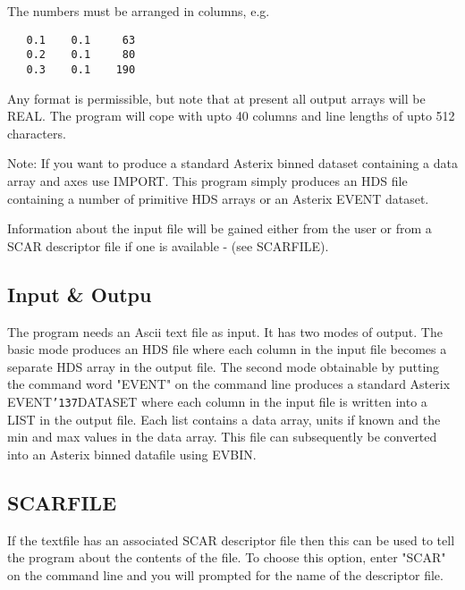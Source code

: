 \documentclass{book}
\renewcommand{\_}{{\tt\char'137}}     %
\begin{document}
The numbers must be arranged in columns, e.g.
 
\begin{verbatim}
   0.1    0.1     63
   0.2    0.1     80
   0.3    0.1    190
\end{verbatim}
Any format is permissible, but note that at present all output arrays
will be REAL. The program will cope with upto 40 columns and line
lengths of upto 512 characters.
 
Note: If you want to produce a standard Asterix binned dataset containing
a data array and axes use IMPORT. This program simply produces an
HDS file containing a number of primitive HDS arrays or an Asterix
EVENT dataset.
 
Information about the input file will be gained either from the user
or from a SCAR descriptor file if one is available - (see SCARFILE).
 
\subsection{Input \& Outpu}
The program needs an Ascii text file as input. It has two modes of
output. The basic mode produces an HDS file where each column in the
input file becomes a separate HDS array in the output file.
The second mode obtainable by putting the command word "EVENT" on
the command line produces a standard Asterix EVENT\_DATASET where each
column in the input file is written into a LIST in the output file.
Each list contains a data array, units if known and the min and
max values in the data array. This file can subsequently be converted
into an Asterix binned datafile using EVBIN.
 
\subsection{SCARFILE}
If the textfile has an associated SCAR descriptor file then this can
be used to tell the program about the contents of the file. To choose
this option, enter "SCAR" on the command line and you will prompted
for the name of the descriptor file.
 
\end{document}
